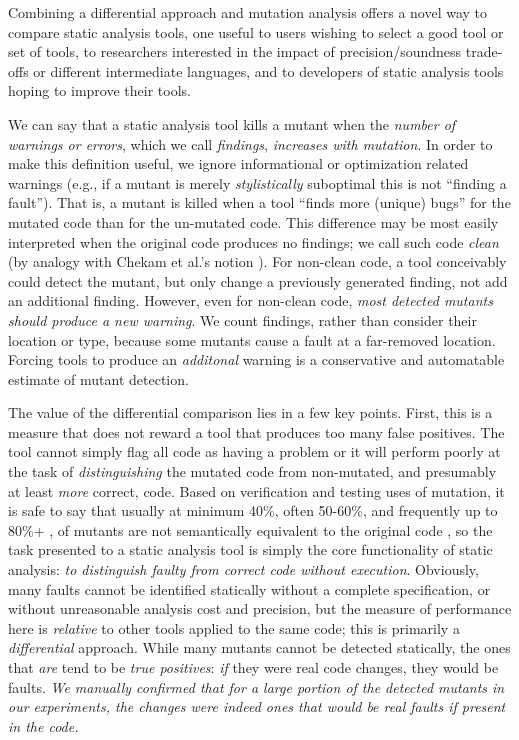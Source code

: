Combining a differential approach and mutation analysis offers a novel way to compare static analysis tools, one useful to users wishing to select a good tool or set of tools, to researchers interested in the impact of precision/soundness trade-offs or different intermediate languages, and to developers of static analysis tools hoping to improve their tools.


We can say that a static analysis tool kills a mutant when the \emph{number of warnings or errors}, which we call \emph{findings}, \emph{increases with mutation}.  In order to make this definition useful, we ignore informational or optimization related warnings (e.g., if a mutant is merely \emph{stylistically} suboptimal this is not ``finding a fault''). That is, a mutant is killed when a tool ``finds more (unique) bugs'' for the mutated code than for the un-mutated code.  This difference may be most easily interpreted when the original code produces no findings; we call such code \emph{clean} (by analogy with Chekam et al.'s notion \cite{CleanProgram}). For non-clean code, a tool conceivably could detect the mutant, but only change a previously generated finding, not add an additional finding.  However, even for non-clean code, \emph{most detected mutants should produce a new warning}.  We count findings, rather than consider their location or type, because some mutants cause a fault at a far-removed location.  Forcing tools to produce an \emph{additonal} warning is a conservative and automatable estimate of mutant detection.

The value of the differential comparison lies in a few key points.  First, this is a measure that does not reward a tool that produces too many false positives.  The tool cannot simply flag all code as having a problem or it will perform poorly at the task of \emph{distinguishing} the mutated code from non-mutated, and presumably at least \emph{more} correct, code.  Based on verification and testing uses of mutation, it is safe to say that usually at minimum 40\%, often 50-60\%, and frequently up to 80\%+ \cite{mutKernel,groce2018verified,le2014mucheck}, of mutants are not semantically equivalent to the original code \cite{TCE,impactEquiv,smith2009should}, so the task presented to a static analysis tool is simply the core functionality of static analysis: \emph{to distinguish faulty from correct code without execution}.  Obviously, many faults cannot be identified statically without a complete specification, or without unreasonable analysis cost and precision, but the measure of performance here is \emph{relative} to other tools applied to the same code; this is primarily a \emph{differential} approach.  While many mutants cannot be detected statically, the ones that \emph{are} tend to be \emph{true positives}: \emph{if} they were real code changes, they would be faults.  \emph{We manually confirmed that for a large portion of the detected mutants in our experiments, the changes were indeed ones that would be real faults if present in the code.}

